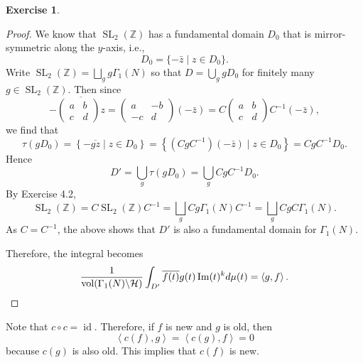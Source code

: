 \documentclass{article}
\theoremstyle{definition}
\newtheorem{example}{Exercise}
\theoremstyle{remark}
\renewcommand{\Im}{\mathop{\mathrm{Im}}}
\newcommand{\Z}{\mathbb{Z}}
\DeclareMathOperator{\SL}{SL}
\DeclareMathOperator{\Id}{id}
\newcommand{\gene}[1]{\left\langle #1 \right\rangle} %
\newcommand{\under}{\backslash}
\DeclareMathOperator{\vol}{vol}
\begin{document}
\begin{example}
\begin{enumerate}
\begin{proof}
We know that $\SL_2(\Z)$ has a fundamental domain $D_0$ that is mirror-symmetric along the $y$-axis,
i.e., \[D_0 = \{-\bar{z}\mid z\in D_0\}.\]
Write $\SL_2(\Z) = \bigsqcup_{g}g\Gamma_1(N)$ so that $D = \bigcup_{g}gD_0$ for finitely many $g\in\SL_2(\Z)$.
Then since \[-\overline{\begin{pmatrix}
    a & b \\ c & d
\end{pmatrix}z} = \begin{pmatrix}
    a & -b \\ -c & d
\end{pmatrix}(-\bar{z}) = C\begin{pmatrix}
    a&b\\c&d
\end{pmatrix} C^{-1}(-\bar{z}),\]
we find that \[\tau(gD_0) =\left\{ -\overline{gz}\mid z\in D_0 \right\} = \left\{ (CgC^{-1})(-\bar z)\mid z\in D_0\right\} = CgC^{-1}D_0.\]
Hence \[D' = \bigcup_{g}\tau(gD_0) = \bigcup_{g}CgC^{-1}D_0.\]
By Exercise 4.2, \[\SL_2(\Z) = C\SL_2(\Z)C^{-1} = \bigsqcup_g Cg\Gamma_1(N)C^{-1} = \bigsqcup_g CgC\Gamma_1(N).\]
As $C = C^{-1}$, the above shows that $D'$
is also a fundamental domain for $\Gamma_1(N)$.

Therefore, the integral becomes\[
\frac{1}{\vol(\Gamma_1(N)\under\mathcal{H})}\int_{D'}
\overline{f(t)}g(t)\Im(t)^kd\mu(t) = \gene{g, f}.
\qedhere
\]
\end{proof}

Note that $c\circ c = \Id$.
Therefore, if $f$ is new and $g$ is old, then \[\gene{c(f), g} = \gene{c(g), f} = 0\]
because $c(g)$ is also old.
This implies that $c(f)$ is new.

\end{enumerate}
\end{example}
\end{document}
